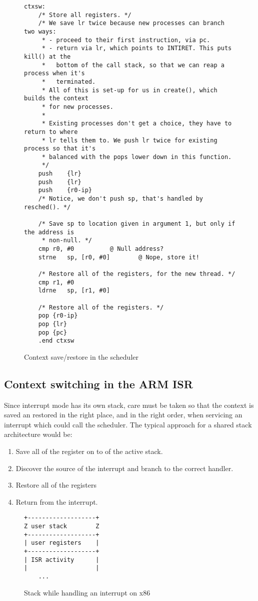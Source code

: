 \documentclass[12pt]{article}
\begin{document}
\begin{figure}
\caption{Context save/restore in the scheduler}
\label{ctxsw}
\small
\begin{verbatim}
ctxsw:
	/* Store all registers. */
	/* We save lr twice because new processes can branch two ways:
	 * - proceed to their first instruction, via pc.
	 * - return via lr, which points to INTIRET. This puts kill() at the
	 *   bottom of the call stack, so that we can reap a process when it's
	 *   terminated.
	 * All of this is set-up for us in create(), which builds the context
	 * for new processes.
	 *
	 * Existing processes don't get a choice, they have to return to where
	 * lr tells them to. We push lr twice for existing process so that it's
	 * balanced with the pops lower down in this function.
	 */
	push	{lr}
	push	{lr}
	push	{r0-ip}
	/* Notice, we don't push sp, that's handled by resched(). */

	/* Save sp to location given in argument 1, but only if the address is
	 * non-null. */
	cmp	r0, #0			@ Null address?
	strne	sp, [r0, #0]		@ Nope, store it!

	/* Restore all of the registers, for the new thread. */
	cmp	r1, #0
	ldrne	sp, [r1, #0]

	/* Restore all of the registers. */
	pop	{r0-ip}
	pop	{lr}
	pop	{pc}
	.end ctxsw
\end{verbatim}
\end{figure}

\subsection{Context switching in the ARM ISR}

Since interrupt mode has its own stack, care must be taken so that the context
is saved an restored in the right place, and in the right order, when servicing
an interrupt which could call the scheduler. The typical approach for a shared
stack architecture would be:

\begin{enumerate}
\item Save all of the register on to of the active stack.
\item Discover the source of the interrupt and branch to the correct handler.
\item Restore all of the registers
\item Return from the interrupt.
\end{enumerate}

\begin{figure}[h]
\caption{Stack while handling an interrupt on x86}
\label{isr-stack-x86}
\begin{verbatim}
+-------------------+
Z user stack        Z
+-------------------+
| user registers    |
+-------------------+
| ISR activity      |
|                   |
    ...
\end{verbatim}
\end{figure}
\end{document}
